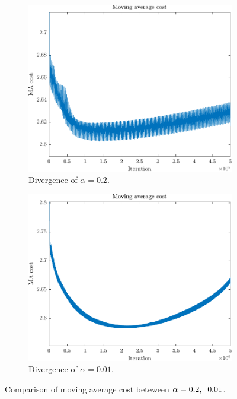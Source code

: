 \begin{figure}
	\centering
	\begin{subfigure}{.5\textwidth}
		\centering
		\includegraphics[width=1\linewidth]{figures/DoubleApprox02.pdf}
		\caption{Divergence of $\alpha = 0.2$.}
		\label{fig:Divergence02}
	\end{subfigure}%
	\begin{subfigure}{.5\textwidth}
		\centering
		\includegraphics[width=1\linewidth]{figures/DoubleApprox001.pdf}
		\caption{Divergence of $\alpha = 0.01$.}
		\label{fig:Divergence001}
	\end{subfigure}
	\caption{Comparison of moving average cost beteween $\alpha = 0.2, \hspace{0.2cm} 0.01$.}
	\label{fig:DivergenceComparison}
\end{figure}

